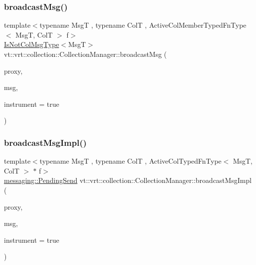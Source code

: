\mbox{\label{structvt_1_1vrt_1_1collection_1_1_collection_manager_a42cfab20eec557ba82f70d90afa3e7a1}} 
\subsubsection{\texorpdfstring{broadcast\+Msg()}{broadcastMsg()}\hspace{0.1cm}{\footnotesize\ttfamily [6/6]}}
{\footnotesize\ttfamily template$<$typename MsgT , typename ColT , Active\+Col\+Member\+Typed\+Fn\+Type$<$ Msg\+T, Col\+T $>$ f$>$ \\
\hyperlink{structvt_1_1vrt_1_1collection_1_1_collection_manager_ae376deeefd4f89a0b1c93849977715d9}{Is\+Not\+Col\+Msg\+Type}$<$MsgT$>$ vt\+::vrt\+::collection\+::\+Collection\+Manager\+::broadcast\+Msg (\begin{DoxyParamCaption}\item[{\hyperlink{structvt_1_1vrt_1_1collection_1_1_collection_manager_a56458ed7f9bb22b631b9b3a745f42f94}{Collection\+Proxy\+Wrap\+Type}$<$ ColT $>$ const \&}]{proxy,  }\item[{MsgT $\ast$}]{msg,  }\item[{bool}]{instrument = {\ttfamily true} }\end{DoxyParamCaption})}

\mbox{\label{structvt_1_1vrt_1_1collection_1_1_collection_manager_ac7a9c72784d76ddf0346926bbb147e8c}} 
\subsubsection{\texorpdfstring{broadcast\+Msg\+Impl()}{broadcastMsgImpl()}\hspace{0.1cm}{\footnotesize\ttfamily [1/2]}}
{\footnotesize\ttfamily template$<$typename MsgT , typename ColT , Active\+Col\+Typed\+Fn\+Type$<$ Msg\+T, Col\+T $>$ $\ast$ f$>$ \\
\hyperlink{structvt_1_1messaging_1_1_pending_send}{messaging\+::\+Pending\+Send} vt\+::vrt\+::collection\+::\+Collection\+Manager\+::broadcast\+Msg\+Impl (\begin{DoxyParamCaption}\item[{\hyperlink{structvt_1_1vrt_1_1collection_1_1_collection_manager_a56458ed7f9bb22b631b9b3a745f42f94}{Collection\+Proxy\+Wrap\+Type}$<$ ColT $>$ const \&}]{proxy,  }\item[{MsgT $\ast$}]{msg,  }\item[{bool}]{instrument = {\ttfamily true} }\end{DoxyParamCaption})}

